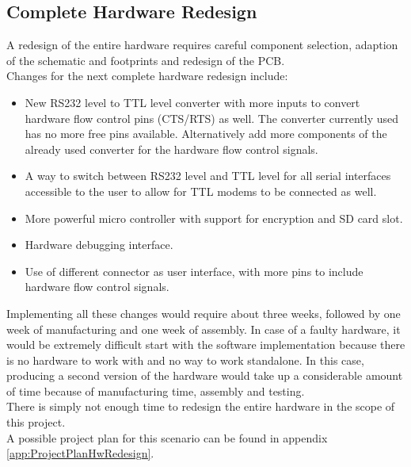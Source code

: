 \subsection{Complete Hardware Redesign}
A redesign of the entire hardware requires careful component selection, adaption of the schematic and footprints and redesign of the PCB. \\
Changes for the next complete hardware redesign include:
\begin{itemize}
    \item New RS232 level to TTL level converter with more inputs to convert hardware flow control pins (CTS/RTS) as well. The converter currently used has no more free pins available. Alternatively add more components of the already used converter for the hardware flow control signals.
    \item A way to switch between RS232 level and TTL level for all serial interfaces accessible to the user to allow for TTL modems to be connected as well.
    \item More powerful micro controller with support for encryption and SD card slot.
    \item Hardware debugging interface.
    \item Use of different connector as user interface, with more pins to include hardware flow control signals.
\end{itemize}
Implementing all these changes would require about three weeks, followed by one week of manufacturing and one week of assembly. In case of a faulty hardware, it would be extremely difficult start with the software implementation because there is no hardware to work with and no way to work standalone. In this case, producing a second version of the hardware would take up a considerable amount of time because of manufacturing time, assembly and testing.\\
There is simply not enough time to redesign the entire hardware in the scope of this project.\\
A possible project plan for this scenario can be found in appendix \autoref{app:ProjectPlanHwRedesign}.
%
